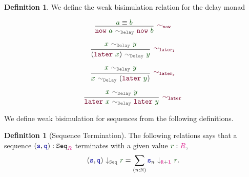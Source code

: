 \documentclass[twoside,11pt,openright]{report}
\theoremstyle{plain} %
\theoremstyle{definition}
\newtheorem{defn}[thm]{Definition}%
\theoremstyle{remark}
\newcommand*{\term}[1]{\textcolor{green!30!black}{#1}} %
\newcommand*{\type}[1]{\textcolor{magenta!90!black}{#1}}
\newcommand*{\unit}{\type{\textbf{1}}}
\newcommand*{\relation}[1]{\textcolor{gray!75!black}{\ensuremath{\mathtt{#1}}}}
\newcommand*{\function}[1]{\textcolor{blue!60!black}{\ensuremath{\mathtt{#1}}}}
\newcommand*{\constructor}[1]{\textcolor{purple!60!black}{\ensuremath{\mathtt{#1}}}}
\newcommand*{\typeformer}[1]{\ensuremath{\mathtt{#1}}}
\begin{document}
\begin{defn}
  We define the weak bisimulation relation for the delay monad
  \begin{center}
    \strut
    \hfill
    \begin{minipage}[h]{0.375\linewidth}
      \begin{equation}
        \vcenter{\infer[\constructor{\sim_{now}}]{\constructor{now}~\term{a}~\relation{\sim_{Delay}}~\constructor{now}~\term{b}}{\term{a} \equiv \term{b}}}
      \end{equation}
    \end{minipage}
    \hfill
    \begin{minipage}[h]{0.375\linewidth}
      \begin{equation}
        \vcenter{\infer[\constructor{\sim_{later_l}}]{(\constructor{later}~\term{x})~\relation{\sim_{Delay}}~\term{y}}{\term{x}~\relation{\sim_{Delay}}~\term{y}}}
      \end{equation}
    \end{minipage}
    \hfill
    \strut
  \end{center}
  \begin{center}
    \strut
    \hfill
    \begin{minipage}[h]{0.375\linewidth}
      \begin{equation}
        \vcenter{\infer[\constructor{\sim_{later_r}}]{\term{x}~\relation{\sim_{Delay}}~(\constructor{later}~\term{y})}{\term{x}~\relation{\sim_{Delay}}~\term{y}}}
      \end{equation}
    \end{minipage}
    \hfill
    \begin{minipage}[h]{0.425\linewidth}
      \begin{equation}
        \vcenter{\infer[\constructor{\sim_{later}}]{\constructor{later}~\term{x}~\relation{\sim_{Delay}}~\constructor{later}~\term{y}}{\term{x}~\relation{\sim_{Delay}}~\term{y}}}
      \end{equation}
    \end{minipage}
    \hfill
    \strut
  \end{center}
\end{defn}
\noindent We define weak bisimulation for sequences from the following definitions.
\begin{defn}[Sequence Termination]
  The following relations says that a sequence \((\function{s},\function{q}) : \typeformer{Seq}_{\type{R}}\) terminates with a given value \(\term{r} : \type{R}\),
  \begin{equation}
    (\function{s},\function{q})~\relation{\downarrow_{Seq}}~\term{r} = \sum_{(n : \mathbb{N})} \function{s}_n~\relation{\downarrow_{\type{R} + \unit}}~\term{r}.
  \end{equation}
\end{defn}
\end{document}
